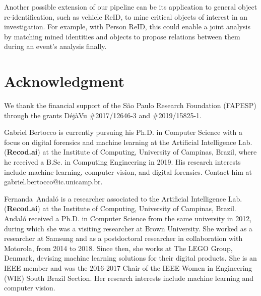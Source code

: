 \documentclass[journal]{IEEEtran}
\begin{document}
Another possible extension of our pipeline can be its application to general object re-identification, such as vehicle ReID, to mine critical objects of interest in an investigation. For example, with Person ReID, this could enable a joint analysis by matching mined identities and objects to propose relations between them during an event's analysis finally.


\section*{Acknowledgment}
We thank the financial support of the São Paulo Research Foundation (FAPESP) through the grants D\'ej\`aVu \#2017/12646-3 and \#2019/15825-1.

\ifCLASSOPTIONcaptionsoff
  \newpage
\fi

















\begin{IEEEbiography}
{Gabriel Bertocco} is currently pursuing his Ph.D. in Computer Science with a focus on digital forensics and machine learning at the Artificial Intelligence Lab. (\textbf{Recod.ai}) at the Institute of Computing, University of Campinas, Brazil, where he received a B.Sc.
in Computing Engineering in 2019. His research interests include machine learning, computer vision, and digital forensics. Contact him at gabriel.bertocco@ic.unicamp.br.
\end{IEEEbiography}

\begin{IEEEbiography}
{Fernanda~Andal\'{o}}
is a researcher associated to the Artificial Intelligence Lab. (\textbf{Recod.ai}) at the Institute of Computing, University of Campinas, Brazil. Andal\'{o} received a Ph.D. in Computer Science from the same university in 2012, during which she was a visiting researcher at Brown University. She worked as a researcher at Samsung and as a postdoctoral researcher in collaboration with Motorola, from 2014 to 2018. Since then, she works at The LEGO Group, Denmark, devising machine learning solutions for their digital products. She is an IEEE member and was the 2016-2017 Chair of the IEEE Women in Engineering (WIE) South Brazil Section. Her research interests include machine learning and computer vision.
\end{IEEEbiography}
\end{document}
